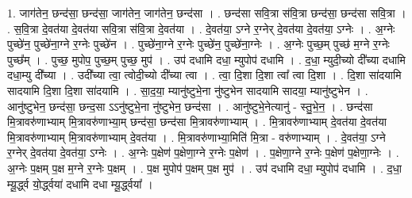 \documentclass[17pt]{extarticle}
\begin{document}
1. जाग॑तेन॒ छन्द॑सा॒ छन्द॑सा॒ जाग॑तेन॒ जाग॑तेन॒ छन्द॑सा । . छन्द॑सा सवि॒त्रा स॑वि॒त्रा छन्द॑सा॒ छन्द॑सा सवि॒त्रा । . स॒वि॒त्रा दे॒वत॑या दे॒वत॑या सवि॒त्रा स॑वि॒त्रा दे॒वत॑या । . दे॒वत॑या॒ ऽग्ने र॒ग्नेर् दे॒वत॑या दे॒वत॑या॒ ऽग्नेः । . अ॒ग्नेः पुच्छे॑न॒ पुच्छे॑ना॒ग्ने र॒ग्नेः पुच्छे॑न । . पुच्छे॑ना॒ग्ने र॒ग्नेः पुच्छे॑न॒ पुच्छे॑ना॒ग्नेः । . अ॒ग्नेः पुच्छ॒म् पुच्छ॑ म॒ग्ने र॒ग्नेः पुच्छ᳚म् । . पुच्छ॒ मुपोप॒ पुच्छ॒म् पुच्छ॒ मुप॑ । . उप॑ दधामि दधा॒ म्युपोप॑ दधामि । . द॒धा॒ म्युदी॒च्यो दी᳚च्या दधामि दधा॒म्यु दी᳚च्या । . उदी᳚च्या त्वा॒ त्वोदी॒च्यो दी᳚च्या त्वा । . त्वा॒ दि॒शा दि॒शा त्वा᳚ त्वा दि॒शा । . दि॒शा सा॑दयामि सादयामि दि॒शा दि॒शा सा॑दयामि । . सा॒द॒या॒ म्यानु॑ष्टुभे॒ना नु॑ष्टुभेन सादयामि सादया॒ म्यानु॑ष्टुभेन । . आनु॑ष्टुभेन॒ छन्द॑सा॒ छन्द॒सा ऽऽनु॑ष्टुभे॒ना नु॑ष्टुभेन॒ छन्द॑सा । . आनु॑ष्टुभे॒नेत्यानु॑ - स्तु॒भे॒न॒ । . छन्द॑सा मि॒त्रावरु॑णाभ्याम् मि॒त्रावरु॑णाभ्या॒म् छन्द॑सा॒ छन्द॑सा मि॒त्रावरु॑णाभ्याम् । . मि॒त्रावरु॑णाभ्याम् दे॒वत॑या दे॒वत॑या मि॒त्रावरु॑णाभ्याम् मि॒त्रावरु॑णाभ्याम् दे॒वत॑या । . मि॒त्रावरु॑णाभ्या॒मिति॑ मि॒त्रा - वरु॑णाभ्याम् । . दे॒वत॑या॒ ऽग्ने र॒ग्नेर् दे॒वत॑या दे॒वत॑या॒ ऽग्नेः । . अ॒ग्नेः प॒क्षेण॑ प॒क्षेणा॒ग्ने र॒ग्नेः प॒क्षेण॑ । . प॒क्षेणा॒ग्ने र॒ग्नेः प॒क्षेण॑ प॒क्षेणा॒ग्नेः । . अ॒ग्नेः प॒क्षम् प॒क्ष म॒ग्ने र॒ग्नेः प॒क्षम् । . प॒क्ष मुपोप॑ प॒क्षम् प॒क्ष मुप॑ । . उप॑ दधामि दधा॒ म्युपोप॑ दधामि । . द॒धा॒ म्यू॒र्द्ध्व यो॒र्द्ध्वया॑ दधामि दधा म्यू॒र्द्ध्वया᳚ । \newline
\end{document}
